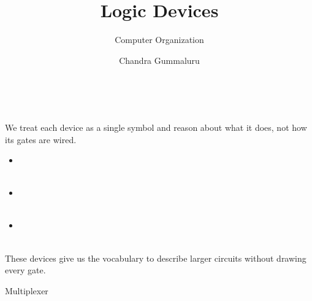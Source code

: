\documentclass[mathserif, handout]{beamer}
\title{Logic Devices}
\subtitle{Computer Organization}
\author[C. Gummaluru]{Chandra Gummaluru}
\institute[]{\url{chandra-gummaluru.github.io} }
\date[Computer Organization]{}
\begin{document}
\begin{frame}
  \maketitle
\end{frame}

\begin{frame}
  \begin{center}
     \\[2mm]
  \end{center}
\end{frame}

\begin{frame}
  We treat each device as a single symbol and reason about what it does, not how its gates are wired.\\[3mm]
  \begin{itemize}
    \item {}\\
     \\[2mm]
    \item {}\\
     \\[2mm]
    \item {}\\
  \end{itemize}\\[3mm]
These devices give us the vocabulary to describe larger circuits without drawing every gate.
\end{frame}

\begin{frame}{Multiplexer}
  \begin{center}
    \Large {}
  \end{center}
\end{frame}
\end{document}

